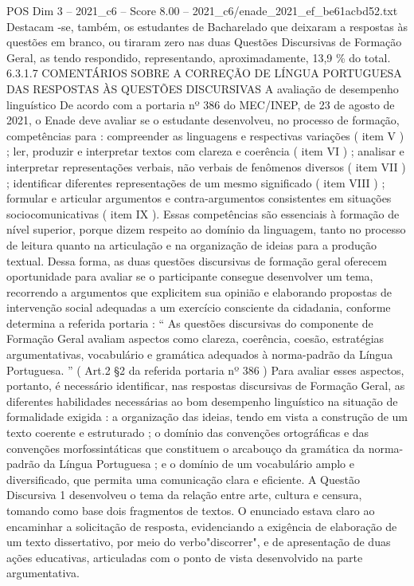 \begin{textsample}{POS Dim 3 – 2021\_c6 – Score 8.00 – 2021\_c6/enade\_2021\_ef\_be61acbd52.txt}
Destacam -se, também, os estudantes de Bacharelado que deixaram a respostas às questões em branco, ou tiraram zero nas duas Questões Discursivas de Formação Geral, as tendo respondido, representando, aproximadamente, 13,9 \% do total. 6.3.1.7 COMENTÁRIOS SOBRE A CORREÇÃO DE LÍNGUA PORTUGUESA DAS RESPOSTAS ÀS QUESTÕES DISCURSIVAS A avaliação de desempenho linguístico De acordo com a portaria nº 386 do MEC/INEP, de 23 de agosto de 2021, o Enade deve avaliar se o estudante desenvolveu, no processo de formação, competências para : compreender as linguagens e respectivas variações ( item V ) ; ler, produzir e interpretar textos com clareza e coerência ( item VI ) ; analisar e interpretar representações verbais, não verbais de fenômenos diversos ( item VII ) ; identificar diferentes representações de um mesmo significado ( item VIII ) ; formular e articular argumentos e contra-argumentos consistentes em situações sociocomunicativas ( item IX ).
Essas competências são essenciais à formação de nível superior, porque dizem respeito ao domínio da linguagem, tanto no processo de leitura quanto na articulação e na organização de ideias para a produção textual.
Dessa forma, as duas questões discursivas de formação geral oferecem oportunidade para avaliar se o participante consegue desenvolver um tema, recorrendo a argumentos que explicitem sua opinião e elaborando propostas de intervenção social adequadas a um exercício consciente da cidadania, conforme determina a referida portaria : “ As questões discursivas do componente de Formação Geral avaliam aspectos como clareza, coerência, coesão, estratégias argumentativas, vocabulário e gramática adequados à norma-padrão da Língua Portuguesa. ” ( Art.2 §2 da referida portaria nº 386 ) Para avaliar esses aspectos, portanto, é necessário identificar, nas respostas discursivas de Formação Geral, as diferentes habilidades necessárias ao bom desempenho linguístico na situação de formalidade exigida : a organização das ideias, tendo em vista a construção de um texto coerente e estruturado ; o domínio das convenções ortográficas e das convenções morfossintáticas que constituem o arcabouço da gramática da norma-padrão da Língua Portuguesa ; e o domínio de um vocabulário amplo e diversificado, que permita uma comunicação clara e eficiente.
A Questão Discursiva 1 desenvolveu o tema da relação entre arte, cultura e censura, tomando como base dois fragmentos de textos.
O enunciado estava claro ao encaminhar a solicitação de resposta, evidenciando a exigência de elaboração de um texto dissertativo, por meio do verbo"discorrer", e de apresentação de duas ações educativas, articuladas com o ponto de vista desenvolvido na parte argumentativa.

\end{textsample}
